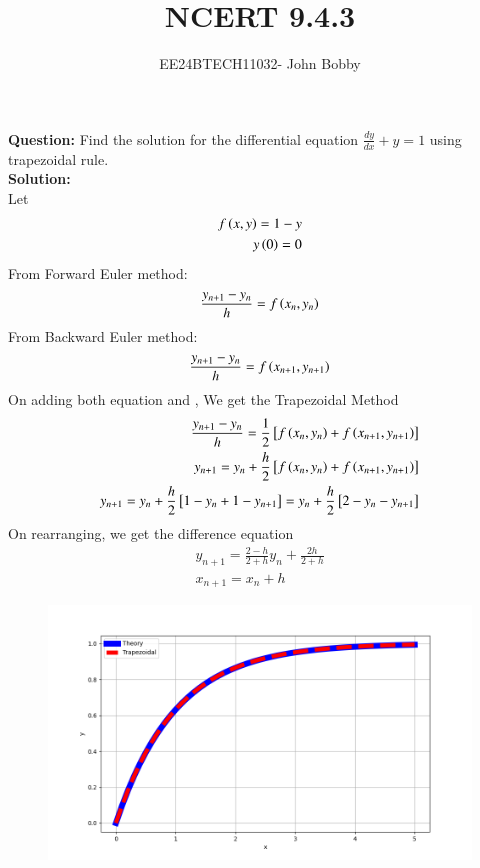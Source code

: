 \documentclass[journal,12pt,onecolumn]{IEEEtran}
\theoremstyle{remark}
\begin{document}

\vspace{3cm}

\title{\textbf{NCERT 9.4.3}}
\author{EE24BTECH11032- John Bobby}
\maketitle
\bigskip
\textbf{Question:} Find the solution for the differential equation $\frac{dy}{dx}+y=1$ using trapezoidal rule.\\
\textbf{Solution:}\\
Let
\begin{align}
    f\left(x,y\right)=1-y\\
    y\left(0\right)=0
\end{align}
From Forward Euler method:
\begin{align}
\frac{y_{n+1}-y_{n}}{h}=f\left(x_{n},y_{n}\right)
\end{align}
From Backward Euler method:
\begin{align}
    \frac{y_{n+1}-y_{n}}{h}=f\left(x_{n+1},y_{n+1}\right)
\end{align}
On adding both equation  and , We get the Trapezoidal Method
\begin{align}
    \frac{y_{n+1}-y_{n}}{h}=\frac{1}{2}{}\left[f\left(x_n,y_n\right)+f\left(x_{n+1},y_{n+1}\right)\right]\\
    y_{n+1}=y_{n}+\frac{h}{2}{}\left[f\left(x_n,y_n\right)+f\left(x_{n+1},y_{n+1}\right)\right]\\
    y_{n+1}=y_n+\frac{h}{2}{}\left[1-y_n+1-y_{n+1}\right]=y_n+\frac{h}{2}{}\left[2-y_n-y_{n+1}\right]\\
\end{align}
On rearranging, we get the difference equation
\begin{align}
    y_{n+1}=\frac{2-h}{2+h}y_n+\frac{2h}{2+h}\\ 
    x_{n+1}=x_n +h
\end{align}
\begin{figure}[h!]
    \centering
    \includegraphics[width=0.7\columnwidth]{figs/Q2.png}
    \label{stemplot}
\end{figure}
\end{document}
